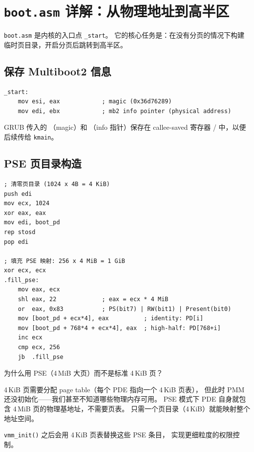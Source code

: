 \section{\texttt{boot.asm} 详解：从物理地址到高半区}

\texttt{boot.asm} 是内核的入口点 \texttt{\_start}。
它的核心任务是：在没有分页的情况下构建临时页目录，开启分页后跳转到高半区。

\subsection{保存 Multiboot2 信息}

\begin{lstlisting}[style=nasmstyle]
_start:
    mov esi, eax            ; magic (0x36d76289)
    mov edi, ebx            ; mb2 info pointer (physical address)
\end{lstlisting}

GRUB 传入的 （magic）和 （info 指针）保存在 callee-saved
寄存器 / 中，以便后续传给 \texttt{kmain}。

\subsection{PSE 页目录构造}

\begin{lstlisting}[style=nasmstyle]
; 清零页目录 (1024 x 4B = 4 KiB)
push edi
mov ecx, 1024
xor eax, eax
mov edi, boot_pd
rep stosd
pop edi

; 填充 PSE 映射: 256 x 4 MiB = 1 GiB
xor ecx, ecx
.fill_pse:
    mov eax, ecx
    shl eax, 22             ; eax = ecx * 4 MiB
    or  eax, 0x83           ; PS(bit7) | RW(bit1) | Present(bit0)
    mov [boot_pd + ecx*4], eax          ; identity: PD[i]
    mov [boot_pd + 768*4 + ecx*4], eax  ; high-half: PD[768+i]
    inc ecx
    cmp ecx, 256
    jb  .fill_pse
\end{lstlisting}

\begin{whybox}
为什么用 PSE（4\,MiB 大页）而不是标准 4\,KiB 页？

4\,KiB 页需要分配 page table（每个 PDE 指向一个 4\,KiB 页表），
但此时 PMM 还没初始化——我们甚至不知道哪些物理内存可用。
PSE 模式下 PDE 自身就包含 4\,MiB 页的物理基地址，不需要页表。
只需一个页目录（4\,KiB）就能映射整个地址空间。

\texttt{vmm\_init()} 之后会用 4\,KiB 页表替换这些 PSE 条目，
实现更细粒度的权限控制。
\end{whybox}

